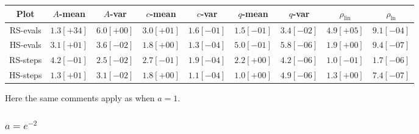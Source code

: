 \begin{table}[H]
    \centering
    \small
    \begin{tabular}{c||c|c|c|c|c|c|c|c}
Plot & \(A\)-mean & \(A\)-var & \(c\)-mean & \(c\)-var & \(q\)-mean & \(q\)-var & \(\rho_{\operatorname{lin}}\) & \(\rho_{\ln}\)\\\hline
\rowcolor{red}
RS-evals & \(1.3[+34]\) & \(6.0[+00]\) & \(3.0[+01]\) & \(1.6[-01]\) & \(1.5[-01]\) & \(3.4[-02]\) & \(4.9[+05]\) & \(9.1[-04]\) \\
\rowcolor{green}
HS-evals & \(3.1[+01]\) & \(3.6[-02]\) & \(1.8[+00]\) & \(1.3[-04]\) & \(5.0[-01]\) & \(5.8[-06]\) & \(1.9[+00]\) & \(9.4[-07]\) \\
\rowcolor{green}
RS-steps & \(4.2[-01]\) & \(2.5[-02]\) & \(2.7[-01]\) & \(1.9[-04]\) & \(2.2[+00]\) & \(4.2[-06]\) & \(1.0[-01]\) & \(1.7[-06]\) \\
\rowcolor{green}
HS-steps & \(1.3[+01]\) & \(3.1[-02]\) & \(1.8[+00]\) & \(1.1[-04]\) & \(1.0[+00]\) & \(4.9[-06]\) & \(1.3[+00]\) & \(7.4[-07]\) \\
    \end{tabular}
    \label{tab:my_label}
\end{table}

Here the same comments apply as when \(a = 1\).

\subsubsection{\(a = e^{-2}\)}

